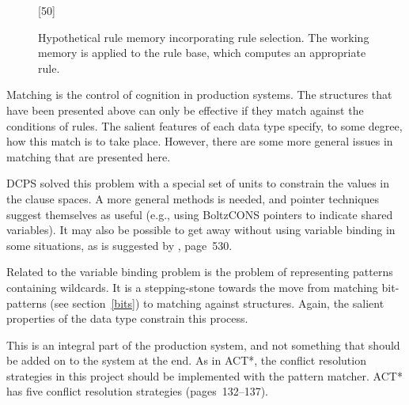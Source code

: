 \begin{figure}
[50]
\vspace{2.7 in}
\caption{Hypothetical rule memory incorporating rule selection.  The
working memory is applied to the rule base, which computes an
appropriate rule.}
\label{rulemem}
\end{figure}


Matching is the control of cognition in production systems.  The
structures that have been presented above can only be effective if
they match against the conditions of rules.  The salient features
of each data type specify, to some degree, how this match
is to take place.  However, there are some more general issues in
matching that are presented here.

  DCPS solved this problem with a special
set of units to constrain the values in the clause spaces.  A more
general methods is needed, and pointer techniques suggest themselves
as useful (e.g., using BoltzCONS pointers to indicate shared
variables). It may also be possible to get away without using variable
binding in some situations, as is suggested by ,
page~530.

  Related to the variable binding
problem is the problem of representing patterns containing wildcards.
It is a stepping-stone towards the move from matching bit-patterns
(see section~\ref{bits}) to matching against structures.  Again, the
salient properties of the data type constrain this process.

  This is an integral part of the
production system, and not something that should be added on
to the system at the end.  As in ACT*, the conflict resolution
strategies in this project should be implemented with the pattern
matcher. ACT* has five
conflict resolution strategies (pages~132--137).

